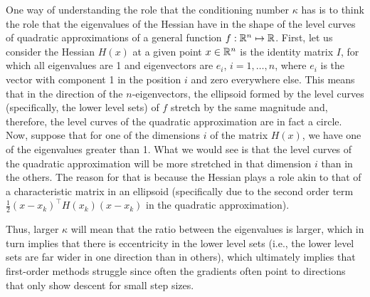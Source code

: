 One way of understanding the role that the conditioning number $\kappa$ has is to think the role that the eigenvalues of the Hessian have in the shape of the level curves of quadratic approximations of a general function $f : \mathbb{R}^n \mapsto \mathbb{R}$. First, let us consider the Hessian $H(x)$ at a given point $x \in \mathbb{R}^n$ is the identity matrix $I$, for which all eigenvalues are 1 and eigenvectors are $e_i$, $i = 1, \dots, n$, where $e_i$ is the vector with component 1 in the position $i$ and zero everywhere else. This means that in the direction of the $n$-eigenvectors, the ellipsoid formed by the level curves (specifically, the lower level sets) of $f$ stretch by the same magnitude and, therefore, the level curves of the quadratic approximation are in fact a circle. Now, suppose that for one of the dimensions $i$ of the matrix $H(x)$, we have one of the eigenvalues greater than 1. What we would see is that the level curves of the quadratic approximation will be more stretched in that dimension $i$ than in the others. The reason for that is because the Hessian plays a role akin to that of a characteristic matrix in an ellipsoid (specifically due to the second order term $\frac{1}{2}(x - x_k)^\top H(x_k)(x - x_k)$ in the quadratic approximation). 

Thus, larger $\kappa$ will mean that the ratio between the eigenvalues is larger, which in turn implies that there is eccentricity in the lower level sets (i.e., the lower level sets are far wider in one direction than in others), which ultimately implies that first-order methods struggle since often the gradients often point to directions that only show descent for small step sizes.

